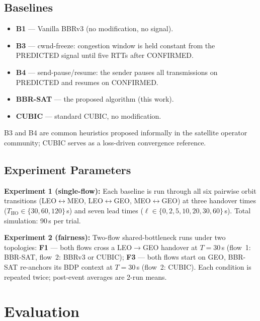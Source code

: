\documentclass[conference]{IEEEtran}
\begin{document}
\subsection{Baselines}

\begin{itemize}
  \item \textbf{B1} --- Vanilla BBRv3 (no modification, no signal).
  \item \textbf{B3} --- cwnd-freeze: congestion window is held constant
        from the PREDICTED signal until five RTTs after CONFIRMED.
  \item \textbf{B4} --- send-pause/resume: the sender pauses all
        transmissions on PREDICTED and resumes on CONFIRMED.
  \item \textbf{BBR-SAT} --- the proposed algorithm (this work).
  \item \textbf{CUBIC} --- standard CUBIC, no modification.
\end{itemize}

B3 and B4 are common heuristics proposed informally in the satellite
operator community; CUBIC serves as a loss-driven convergence reference.

\subsection{Experiment Parameters}

\textbf{Experiment 1 (single-flow):}
Each baseline is run through all six pairwise orbit transitions
(LEO$\leftrightarrow$MEO, LEO$\leftrightarrow$GEO, MEO$\leftrightarrow$GEO)
at three handover times ($T_\mathrm{HO} \in \{30, 60, 120\}$\,s)
and seven lead times ($\ell \in \{0, 2, 5, 10, 20, 30, 60\}$\,s).
Total simulation: 90\,s per trial.

\textbf{Experiment 2 (fairness):}
Two-flow shared-bottleneck runs under two topologies:
\textbf{F1} --- both flows cross a LEO$\to$GEO handover at $T=30$\,s
(flow~1: BBR-SAT, flow~2: BBRv3 or CUBIC);
\textbf{F3} --- both flows start on GEO, BBR-SAT re-anchors its BDP
context at $T=30$\,s (flow~2: CUBIC).
Each condition is repeated twice; post-event averages are 2-run means.

\section{Evaluation}
\label{sec:evaluation}

\end{document}
